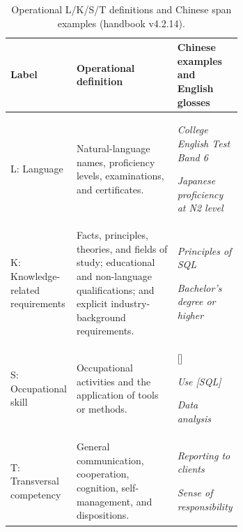 \documentclass[fleqn,12pt]{wlpeerj}
\begin{document}
\setcounter{table}{1}
\begin{table}[!htbp]
\caption{Operational L/K/S/T definitions and Chinese span examples (handbook v4.2.14).}
\label{tab:guide-types}
\centering\small
\setlength{\tabcolsep}{4pt}
\renewcommand{\arraystretch}{1.12}
\begin{tabularx}{\linewidth}{@{}P{0.19\linewidth}P{0.47\linewidth}L@{}}
\toprule
Label & Operational definition & Chinese examples and English glosses \\
\midrule
L: Language & Natural-language names, proficiency levels, examinations, and certificates. & \par\emph{College English Test Band 6}\par\smallskip{}\par\emph{Japanese proficiency at N2 level} \\[3pt]
K: Knowledge-related requirements & Facts, principles, theories, and fields of study; educational and non-language qualifications; and explicit industry-background requirements. & \par\emph{Principles of SQL}\par\smallskip{}\par\emph{Bachelor's degree or higher} \\[3pt]
S: Occupational skill & Occupational activities and the application of tools or methods. & []\par\emph{Use [SQL]}\par\smallskip{}\par\emph{Data analysis} \\[3pt]
T: Transversal competency & General communication, cooperation, cognition, self-management, and dispositions. & \par\emph{Reporting to clients}\par\smallskip{}\par\emph{Sense of responsibility} \\
\bottomrule
\end{tabularx}
\end{table}

\end{document}
